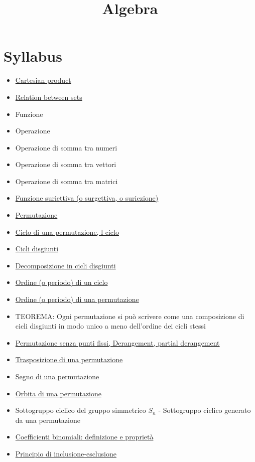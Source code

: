 \documentclass[a4paper,10pt]{article}
\title{Algebra}
\author{}
\begin{document}
\maketitle

\section{Syllabus}
\begin{itemize}
 \item \href{CartesianProduct.html}{Cartesian product}
 \item \href{Relation.html}{Relation between sets}
 \item Funzione
 \item Operazione
 \item Operazione di somma tra numeri
 \item Operazione di somma tra vettori
 \item Operazione di somma tra matrici
 \item \href{./FunzioneSuriettiva.html}{Funzione suriettiva (o surgettiva, o suriezione)} 
 \item \href{./Permutazione.html}{Permutazione}
 \item \href{./PermutazioneCicli.html}{Ciclo di una permutazione, l-ciclo}
 \item \href{./PermutazioniDisgiunte.html}{Cicli disgiunti}
 \item \href{./PermutazioneDecomposizioneCicli.html}{Decomposizione in cicli disgiunti}
 \item \href{./PermutazioneCicliPeriodo.html}{Ordine (o periodo) di un ciclo}
 \item \href{./PermutazionePeriodo.html}{Ordine (o periodo) di una permutazione}
 \item TEOREMA: Ogni permutazione si può scrivere come una composizione di cicli disgiunti in modo unico a meno dell'ordine dei cicli stessi
 \item \href{./Derangement.html}{Permutazione senza punti fissi, Derangement, partial derangement}
 \item \href{./PermutazioneTrasposizione.html}{Trasposizione di una permutazione}
 \item \href{./PermutazioneSegno.html}{Segno di una permutazione}
 \item \href{./PermutazioneOrbita.html}{Orbita di una permutazione}
 \item Sottogruppo ciclico del gruppo simmetrico $S_n$ - Sottogruppo ciclico generato da una permutazione
 \item \href{./CoefficientiBinomiali.html}{Coefficienti binomiali: definizione e proprietà}
 \item \href{./PrincipioInclusioneEsclusione.html}{Principio di inclusione-esclusione}
 

\end{itemize}
\end{document}
